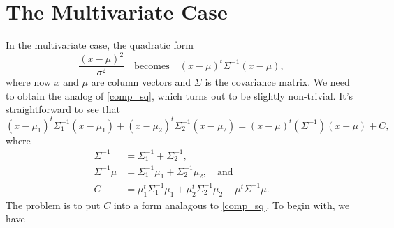 \documentclass[12pt,leqno]{article}
\begin{document}
\section{The Multivariate Case}
In the multivariate case, the quadratic form
$$
\frac{(x-\mu)^2}{\sigma^2}\quad\text{becomes}\quad (x-\mu)^t\Sigma^{-1}(x-\mu),
$$
where now $x$ and $\mu$ are column vectors and $\Sigma$ is the covariance matrix.  We need to obtain
the analog of \eqref{comp_sq}, which turns out to be slightly non-trivial.  It's straightforward to
see that
$$
(x-\mu_1)^t\Sigma_1^{-1}(x-\mu_1) + (x-\mu_2)^t\Sigma_2^{-1}(x-\mu_2) = (x-\mu)^t(\Sigma^{-1})(x-\mu) + C,
$$
where
\begin{align}
 \Sigma^{-1} &= \Sigma_1^{-1} + \Sigma_2^{-1},\label{Sigma}\\
  \Sigma^{-1}\mu &=\Sigma_1^{-1}\mu_1+\Sigma_2^{-1}\mu_2, \quad\text{and}\label{mu}\\
 C &= \mu_1^t\Sigma_1^{-1}\mu_1 +\mu_2^t\Sigma_2^{-1}\mu_2 - \mu^t\Sigma^{-1}\mu.\label{C}
\end{align}
The problem is to put $C$ into a form analagous to \eqref{comp_sq}. To begin with, we have
\end{document}
